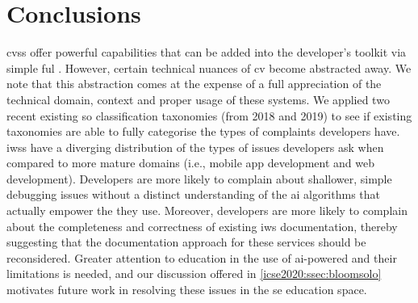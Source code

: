 \section{Conclusions}
\label{icse2020:sec:conclusions}

\Glspl{cvs} offer powerful capabilities that can be added into the developer's toolkit via simple ful . However, certain technical nuances of \gls{cv} become abstracted away. We note that this abstraction comes at the expense of a full appreciation of the technical domain, context and proper usage of these systems. We applied two recent existing \gls{so} classification taxonomies (from 2018 and 2019) to see if existing taxonomies are able to fully categorise the types of complaints developers have. \Glspl{iws} have a diverging distribution of the types of issues developers ask when compared to more mature domains (i.e., mobile app development and web development). Developers are more likely to complain about shallower, simple debugging issues without a distinct understanding of the \gls{ai} algorithms that actually empower the  they use. Moreover, developers are more likely to complain about the completeness and correctness of existing \gls{iws} documentation, thereby suggesting that the documentation approach for these services should be reconsidered. Greater attention to education in the use of \gls{ai}-powered  and their limitations is needed, and our discussion offered in \cref{icse2020:ssec:bloomsolo} motivates future work in resolving these issues in the \gls{se} education space.
